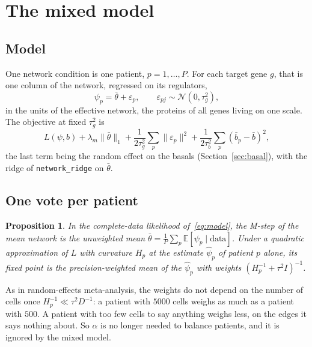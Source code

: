 \documentclass[a4paper, 11pt]{article}
\newcommand{\E}{\mathbb{E}}
\newcommand{\tb}{\bar\theta}
\theoremstyle{plain}
\newtheorem{prop}{Proposition}
\theoremstyle{remark}
\begin{document}
\section{The mixed model}\label{sec:mixed}

\subsection{Model}

One network condition is one patient, $p = 1, \dots, P$. For each target gene $g$, that is one column of the network, regressed on its regulators,
\begin{equation}\label{eq:model}
\psi_p = \tb + \varepsilon_p, \qquad \varepsilon_{pj} \sim \mathcal N(0, \tau_g^2),
\end{equation}
in the units of the effective network, the proteins of all genes living on one scale. The objective at fixed $\tau_g^2$ is
\begin{equation}\label{eq:objective}
L(\psi, b) + \lambda_m \|\tb\|_1 + \frac 1 {2\tau_g^2} \sum_p \|\varepsilon_p\|^2 + \frac 1 {2\tau_b^2} \sum_p (\bar b_p - \bar b)^2 ,
\end{equation}
the last term being the random effect on the basals (Section~\ref{sec:basal}), with the ridge of \texttt{network\_ridge} on $\tb$.

\subsection{One vote per patient}

\begin{prop}\label{prop:mstep}
In the complete-data likelihood of~\eqref{eq:model}, the M-step of the mean network is the unweighted mean $\tb = \frac 1 P \sum_p \E[\psi_p \mid \text{data}]$. Under a quadratic approximation of $L$ with curvature $H_p$ at the estimate $\hat\psi_p$ of patient $p$ alone, its fixed point is the precision-weighted mean of the $\hat\psi_p$ with weights $(H_p^{-1} + \tau^2 I)^{-1}$.
\end{prop}

As in random-effects meta-analysis, the weights do not depend on the number of cells once $H_p^{-1} \ll \tau^2 D^{-1}$: a patient with $5000$ cells weighs as much as a patient with $500$. A patient with too few cells to say anything weighs less, on the edges it says nothing about. So $\alpha$ is no longer needed to balance patients, and it is ignored by the mixed model.
\end{document}
